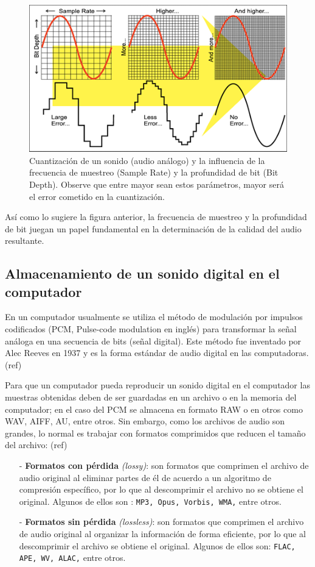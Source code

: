\documentclass[conference,onecolumn]{IEEEtran}
\begin{document}
 \begin{figure}[H]
 \centering
    \includegraphics[scale=1]{img5.png}
    \caption{Cuantización de un sonido (audio análogo) y la influencia de la frecuencia de muestreo (Sample Rate) y la profundidad de bit (Bit Depth). Observe que entre mayor sean estos parámetros, mayor será el error cometido en la cuantización.}
\end{figure}

Así como lo sugiere la figura anterior, la frecuencia de muestreo y la profundidad de bit juegan un papel fundamental en la determinación de la calidad del audio resultante.

\subsection{Almacenamiento de un sonido digital en el computador}
En un computador usualmente se utiliza el método de modulación por impulsos codificados (PCM, Pulse-code modulation en inglés) para transformar la señal análoga en una secuencia de bits (señal digital). Este método fue inventado por Alec Reeves en 1937 y es la forma estándar de audio digital en las computadoras. (ref) 

Para que un computador pueda reproducir un sonido digital en el computador las muestras obtenidas deben de ser guardadas en un archivo o en la memoria del computador; en el caso del PCM se almacena en formato RAW o en otros como WAV, AIFF, AU, entre otros. Sin embargo, como los archivos de audio son grandes, lo normal es trabajar con formatos comprimidos que reducen el tamaño del archivo: (ref) \\

\begin{itemize} %

    \item[-] \textbf{Formatos con pérdida} \textit{(lossy)}: son formatos que comprimen el archivo de audio original al eliminar partes de él de acuerdo a un algoritmo de compresión específico, por lo que al descomprimir el archivo no se obtiene el original. Algunos de ellos son : \texttt{MP3, Opus, Vorbis, WMA,} entre otros.
    \item[-] \textbf{Formatos sin pérdida} \textit{(lossless)}: son formatos que comprimen el archivo de audio original al organizar la información de forma eficiente, por lo que al descomprimir el archivo se obtiene el original. Algunos de ellos son: \texttt{FLAC, APE, WV, ALAC,} entre otros.

\end{itemize}
\end{document}
